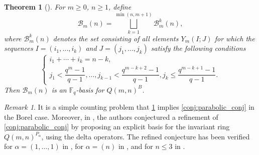 \documentclass[12pt,a4paper]{report}
\newtheorem{theorem}{Theorem}[chapter]
\theoremstyle{definition}
\theoremstyle{remark}
\newtheorem*{remark}{Remark}
\theoremstyle{definition}
\begin{document}
\begin{theorem}[{\cite[Theorem 1.6]{Ha_Hai_Nghia_2024}}]\label{thm:hhn_borel}
    For $m\geq 0$, $n\geq 1$, define
    \begin{equation*}
        \mathcal{B}_m(n) = \bigsqcup\limits_{k=1}^{\min(n, m+1)}\mathcal{B}_m^{k}(n),
    \end{equation*}
    where $\mathcal{B}_m^{k}(n)$ denotes the set consisting of all elements $Y_m(I; J)$ for which the sequences $I = (i_1, \ldots, i_k)$ and $J= (j_1, \ldots, j_k)$ satisfy the following conditions
    \begin{equation*}
        \begin{cases}
            i_1+\cdots + i_k = n-k,\\
            j_1 <\dfrac{q^m-1}{q-1}, \ldots, j_{k-1}<\dfrac{q^{m-k+2}-1}{q-1}, j_k\leq \dfrac{q^{m-k+1}-1}{q-1}.
        \end{cases}
    \end{equation*}
    Then $\mathcal{B}_m(n)$ is an $\mathbb{F}_q$-basis for $Q(m, n)^B$. 
\end{theorem}
\begin{remark}
It is a simple counting problem that \cref{thm:hhn_borel} implies \cref{conj:parabolic_conj} in the Borel case. Moreover, in \cite{ha_hai_nghia_parabolic_for_low_rank}, the authors conjectured a refinement of \cref{conj:parabolic_conj} by proposing an explicit basis for the invariant ring $Q(m, n)^{P_{\alpha}}$, using the delta operators. The refined conjecture has been verified for $\alpha = (1, \ldots, 1)$ in \cite{Ha_Hai_Nghia_2024}, for $\alpha = (n)$ in \cite{ha_hai_nghia_GL}, and for $n\leq 3$ in \cite{ha_hai_nghia_parabolic_for_low_rank}.
\end{remark}
\end{document}
